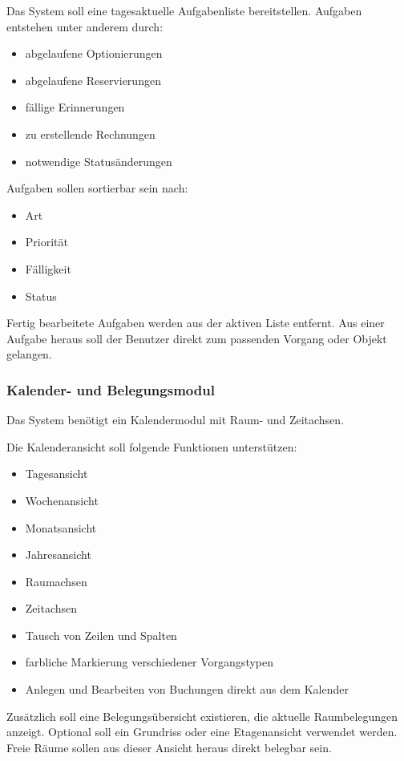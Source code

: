Das System soll eine tagesaktuelle Aufgabenliste bereitstellen. Aufgaben entstehen unter anderem durch:

\begin{itemize}
\item abgelaufene Optionierungen
\item abgelaufene Reservierungen
\item fällige Erinnerungen
\item zu erstellende Rechnungen
\item notwendige Statusänderungen
\end{itemize}

Aufgaben sollen sortierbar sein nach:

\begin{itemize}
\item Art
\item Priorität
\item Fälligkeit
\item Status
\end{itemize}

Fertig bearbeitete Aufgaben werden aus der aktiven Liste entfernt. Aus einer Aufgabe heraus soll der Benutzer direkt zum passenden Vorgang oder Objekt gelangen.

\subsubsection{Kalender- und Belegungsmodul}

Das System benötigt ein Kalendermodul mit Raum- und Zeitachsen.

Die Kalenderansicht soll folgende Funktionen unterstützen:

\begin{itemize}
\item Tagesansicht
\item Wochenansicht
\item Monatsansicht
\item Jahresansicht
\item Raumachsen
\item Zeitachsen
\item Tausch von Zeilen und Spalten
\item farbliche Markierung verschiedener Vorgangstypen
\item Anlegen und Bearbeiten von Buchungen direkt aus dem Kalender
\end{itemize}

Zusätzlich soll eine Belegungsübersicht existieren, die aktuelle Raumbelegungen anzeigt. Optional soll ein Grundriss oder eine Etagenansicht verwendet werden. Freie Räume sollen aus dieser Ansicht heraus direkt belegbar sein.

